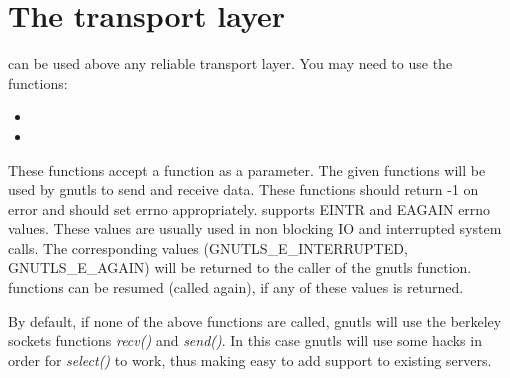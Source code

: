 \section{The transport layer}
\par
\gnutls{} can be used above any reliable transport layer. You may need to
use the functions:
\begin{itemize}
\item {}
\item {}
\end{itemize}
These functions accept a function as a parameter. The given functions will 
be used by gnutls to send and receive data.
These functions should return -1 on error and should set errno appropriately.
\gnutls{} supports EINTR and EAGAIN errno values. These values are
usually used in non blocking IO and interrupted system calls.
The corresponding values (GNUTLS\_E\_INTERRUPTED, GNUTLS\_E\_AGAIN) 
will be returned to the caller of the gnutls function. \gnutls{} functions
can be resumed (called again), if any of these values is returned.
\par
By default, if none of the above functions are called, gnutls will use
the berkeley sockets functions \emph{recv()} and \emph{send()}. In this case
gnutls will use some hacks in order for \emph{select()} to work, thus
making easy to add \tls{} support to existing servers.
